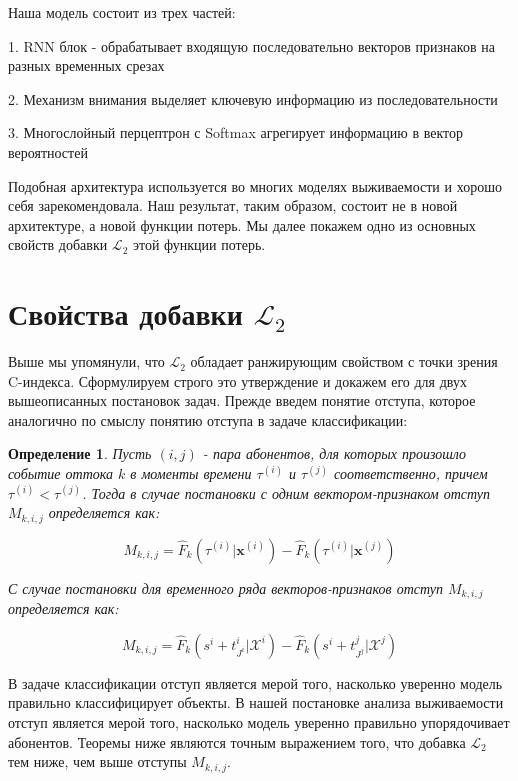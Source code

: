 \documentclass[a4paper,14pt,oneside,openany]{memoir}
\newtheorem{definition}{Определение}
\begin{document}
Наша модель состоит из трех частей:

1. RNN блок - обрабатывает входящую последовательно векторов признаков на разных временных срезах

2. Механизм внимания выделяет ключевую информацию из последовательности

3. Многослойный перцептрон с Softmax агрегирует информацию в вектор вероятностей

Подобная архитектура используется во многих моделях выживаемости и хорошо себя зарекомендовала. Наш результат, таким образом, состоит не в новой архитектуре, а новой функции потерь. Мы далее покажем одно из основных свойств добавки $\mathcal{L}_2$ этой функции потерь.  


\section{Свойства добавки $\mathcal{L}_2$}

Выше мы упомянули, что $\mathcal{L}_2$ обладает ранжирующим свойством с точки зрения C-индекса. Сформулируем строго это утверждение и докажем его для двух вышеописанных постановок задач. Прежде введем понятие отступа, которое аналогично по смыслу понятию отступа в задаче классификации: 

\begin{definition}
Пусть $(i,j)$ - пара абонентов, для которых произошло событие оттока $k$ в моменты времени $\tau^{(i)}$ и $\tau^{(j)}$ соответственно, причем $\tau^{(i)} < \tau^{(j)}$. Тогда в случае постановки с одним вектором-признаком отступ $M_{k,i,j}$ определяется как: 

$$M_{k,i,j} = \hat{F}_k(\tau^{(i)}|\mathbf{x}^{(i)}) - \hat{F}_k(\tau^{(i)}|\mathbf{x}^{(j)}) $$ 

С случае постановки для временного ряда векторов-признаков отступ $M_{k,i,j}$ определяется как:

$$M_{k,i,j} = \hat{F}_k(s^i+t_{J^i}^i|\mathcal{X}^i) - \hat{F}_k(s^i+t_{J^j}^j|\mathcal{X}^j)$$

\end{definition}

В задаче классификации отступ является мерой того, насколько уверенно модель правильно классифицирует объекты. В нашей постановке анализа выживаемости отступ является мерой того, насколько модель уверенно правильно упорядочивает абонентов. Теоремы ниже являются точным выражением того, что добавка $\mathcal{L}_2$ тем ниже, чем выше отступы $M_{k,i,j}$. 
\end{document}

